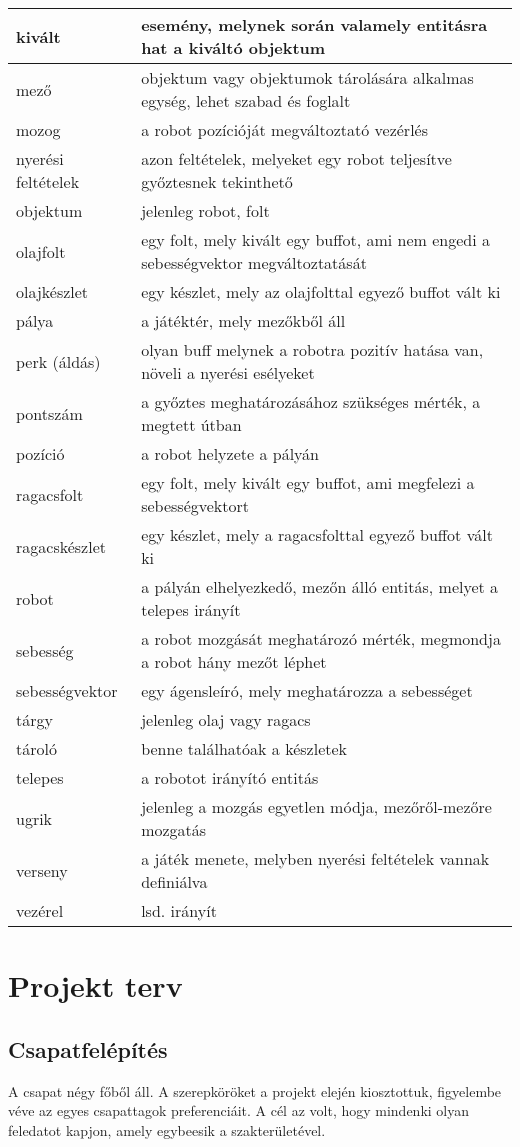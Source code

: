 \begin{tabularx}{\textwidth}{| l | l |}
    kivált &  esemény, melynek során valamely entitásra hat a kiváltó objektum \tabularnewline \hline
    mező &  objektum vagy objektumok tárolására alkalmas egység, lehet szabad és foglalt \tabularnewline \hline
    mozog &  a robot pozícióját megváltoztató vezérlés \tabularnewline \hline
    nyerési feltételek &  azon feltételek, melyeket egy robot teljesítve győztesnek tekinthető \tabularnewline \hline
    objektum &  jelenleg robot, folt \tabularnewline \hline
    olajfolt &  egy folt, mely kivált egy buffot, ami nem engedi a sebességvektor megváltoztatását \tabularnewline \hline
    olajkészlet &  egy készlet, mely az olajfolttal egyező buffot vált ki \tabularnewline \hline
    pálya &  a játéktér, mely mezőkből áll \tabularnewline \hline
    perk (áldás) & olyan buff melynek a robotra pozitív hatása van, növeli a nyerési esélyeket  \tabularnewline \hline
    pontszám &  a győztes meghatározásához szükséges mérték, a megtett útban \tabularnewline \hline
    pozíció &  a robot helyzete a pályán \tabularnewline \hline
    ragacsfolt &  egy folt, mely kivált egy buffot, ami megfelezi a sebességvektort \tabularnewline \hline
    ragacskészlet &  egy készlet, mely a ragacsfolttal egyező buffot vált ki \tabularnewline \hline
    robot &  a pályán elhelyezkedő, mezőn álló entitás, melyet a telepes irányít \tabularnewline \hline
    sebesség &  a robot mozgását meghatározó mérték, megmondja a robot hány mezőt léphet \tabularnewline \hline
    sebességvektor &  egy ágensleíró, mely meghatározza a sebességet \tabularnewline \hline
    tárgy & jelenleg olaj vagy ragacs   \tabularnewline \hline
    tároló &  benne találhatóak a készletek \tabularnewline \hline
    telepes &  a robotot irányító entitás \tabularnewline \hline
    ugrik &  jelenleg a mozgás egyetlen módja, mezőről-mezőre mozgatás \tabularnewline \hline
    verseny &  a játék menete, melyben nyerési feltételek vannak definiálva \tabularnewline \hline
    vezérel & lsd. irányít \tabularnewline \hline
\end{tabularx}

\section{Projekt terv}
\subsection{Csapatfelépítés}
A csapat négy főből áll. A szerepköröket a projekt elején kiosztottuk, figyelembe véve az egyes csapattagok preferenciáit. A cél az volt, hogy mindenki olyan feledatot kapjon, amely egybeesik a szakterületével.

